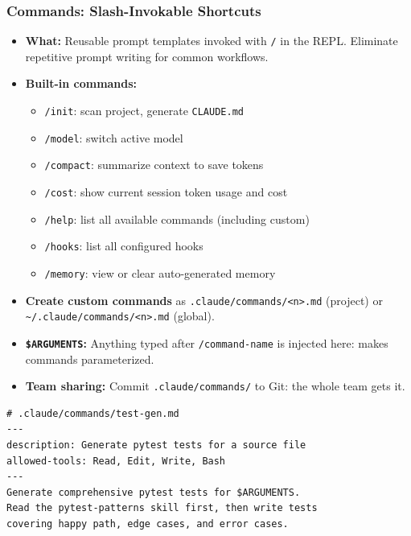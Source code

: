 \begin{frame}[fragile]\frametitle{Commands: Slash-Invokable Shortcuts}
  \begin{itemize}
    \item \textbf{What:} Reusable prompt templates invoked with \texttt{/} in the REPL. Eliminate repetitive prompt writing for common workflows.
    \item \textbf{Built-in commands:}
      \begin{itemize}
        \item \texttt{/init}: scan project, generate \texttt{CLAUDE.md}
        \item \texttt{/model}: switch active model
        \item \texttt{/compact}: summarize context to save tokens
        \item \texttt{/cost}: show current session token usage and cost
        \item \texttt{/help}: list all available commands (including custom)
        \item \texttt{/hooks}: list all configured hooks
        \item \texttt{/memory}: view or clear auto-generated memory
      \end{itemize}
    \item \textbf{Create custom commands} as \texttt{.claude/commands/<n>.md} (project) or \texttt{\textasciitilde/.claude/commands/<n>.md} (global).
    \item \textbf{\texttt{\$ARGUMENTS}:} Anything typed after \texttt{/command-name} is injected here: makes commands parameterized.
    \item \textbf{Team sharing:} Commit \texttt{.claude/commands/} to Git: the whole team gets it.
  \end{itemize}

\begin{lstlisting}
# .claude/commands/test-gen.md
---
description: Generate pytest tests for a source file
allowed-tools: Read, Edit, Write, Bash
---
Generate comprehensive pytest tests for $ARGUMENTS.
Read the pytest-patterns skill first, then write tests
covering happy path, edge cases, and error cases.
\end{lstlisting}
\end{frame}


